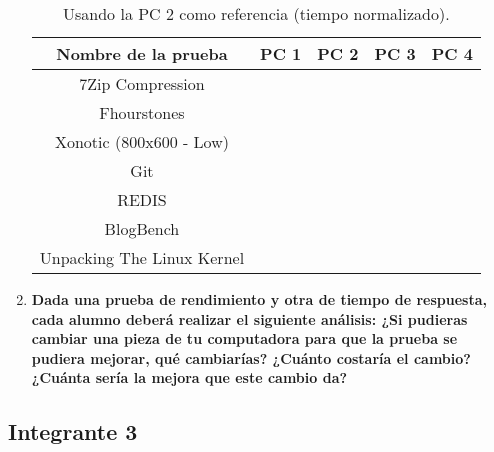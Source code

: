 \documentclass[12pt]{article}
\newcommand{\pl}[1]{\item \textbf{ #1 }}
\begin{document}
\begin{enumerate}[label=(\arabic{section}.\arabic{subsection}.\arabic{enumi})]
    \begin{table}[htb]
        \centering
        \begin{tabular}{|c|c|c|c|c|}
        \hline
        \textbf{Nombre de la prueba} & \textbf{PC 1} & \textbf{PC 2} & \textbf{PC 3} & \textbf{PC 4}\\
        \hline
        7Zip Compression & & & & \\
        \hline
        Fhourstones & & & & \\
        \hline
        Xonotic (800x600 - Low) & & & &  \\
        \hline
        Git & & & &  \\
        \hline
        REDIS & & & &  \\
        \hline
        BlogBench & & & &  \\
        \hline
        Unpacking The Linux Kernel & & & & \\
        \hline
        \end{tabular}
        \caption{Usando la PC 2 como referencia (tiempo normalizado).}
    \end{table}

    \pl{Dada una prueba de rendimiento y otra de tiempo de respuesta, cada alumno deberá realizar el siguiente análisis: ¿Si pudieras cambiar una pieza de tu computadora para que la prueba se pudiera mejorar, qué cambiarías? ¿Cuánto costaría el cambio? ¿Cuánta sería la mejora que este cambio da?}

\end{enumerate}

\subsection{Integrante 3}
\end{document}
